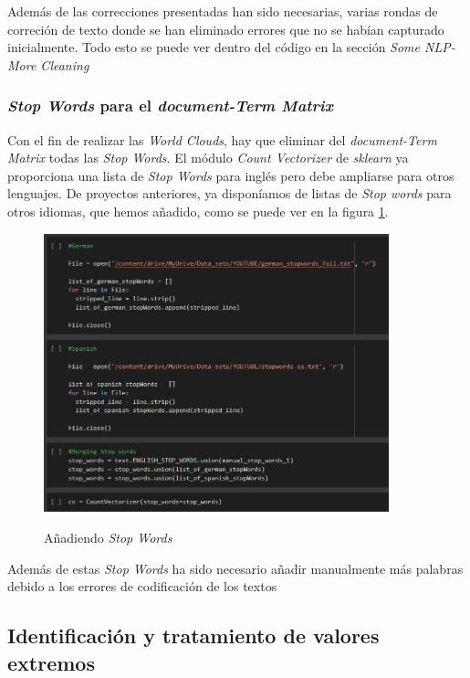 \documentclass[a4paper,12pt]{article}
\begin{document}
Adem\'as de las correcciones presentadas han sido necesarias, varias rondas de correci\'on de texto donde se han eliminado errores que no se hab\'ian capturado inicialmente. Todo esto se puede ver dentro del c\'odigo en la secci\'on {\itshape Some NLP-More Cleaning}

\subsubsection{{\itshape Stop Words} para el {\itshape document-Term Matrix}}

Con el fin de realizar las {\itshape World Clouds}, hay que eliminar del {\itshape document-Term Matrix} todas las {\itshape Stop Words}. El m\'odulo {\itshape Count Vectorizer} de {\itshape sklearn} ya proporciona una lista de {\itshape Stop Words} para ingl\'es pero debe ampliarse para otros lenguajes. De proyectos anteriores, ya dispon\'iamos de listas de {\itshape Stop words} para otros idiomas, que hemos a\~nadido, como se puede ver en la figura \ref{fig:stop}.

\begin{figure}[h!]
\centering
\includegraphics[width=10cm]{Stop_words.JPG}\\
\caption{A\~nadiendo {\itshape Stop Words}}
\label{fig:stop}
\end{figure}

Adem\'as de estas {\itshape Stop Words} ha sido necesario a\~nadir manualmente m\'as palabras debido a los errores de codificaci\'on de los textos

\subsection{Identificaci\'on y tratamiento de valores extremos}
\end{document}
